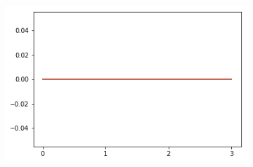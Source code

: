 \begin{figure}[h!]
\begin{subfigure}[b]{0.3\linewidth}
    \caption{}
  \end{subfigure}
  \begin{subfigure}[b]{0.3\linewidth}
    \includegraphics[width=\linewidth]{images/add/ef2_means_neg.png}
    \caption{}
  \end{subfigure}
  

\end{figure}
